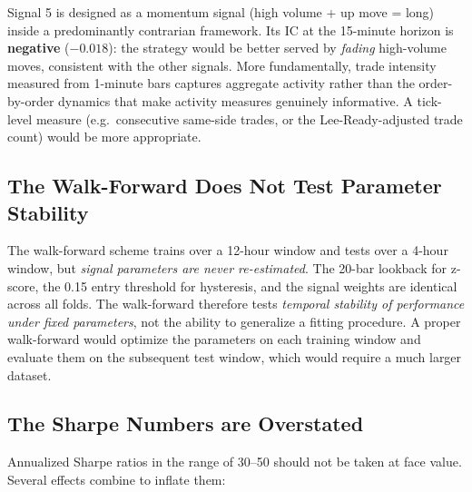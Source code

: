 \documentclass[11pt, a4paper]{article}
\begin{document}
Signal 5 is designed as a momentum signal (high volume + up move = long)
inside a predominantly contrarian framework.  Its IC at the 15-minute horizon
is \textbf{negative} ($-0.018$): the strategy would be better served by
\textit{fading} high-volume moves, consistent with the other signals.
More fundamentally, trade intensity measured from 1-minute bars captures
aggregate activity rather than the order-by-order dynamics that make activity
measures genuinely informative.  A tick-level measure (e.g.\ consecutive same-side
trades, or the Lee-Ready-adjusted trade count) would be more appropriate.

\subsection{The Walk-Forward Does Not Test Parameter Stability}

The walk-forward scheme trains over a 12-hour window and tests over a 4-hour
window, but \textit{signal parameters are never re-estimated}.  The 20-bar
lookback for z-score, the 0.15 entry threshold for hysteresis, and the
signal weights are identical across all folds.  The walk-forward therefore
tests \textit{temporal stability of performance under fixed parameters}, not
the ability to generalize a fitting procedure.  A proper walk-forward would
optimize the parameters on each training window and evaluate them on the
subsequent test window, which would require a much larger dataset.

\subsection{The Sharpe Numbers are Overstated}

Annualized Sharpe ratios in the range of 30--50 should not be taken at face value.
Several effects combine to inflate them:
\end{document}
